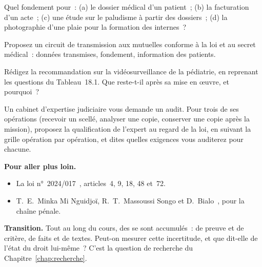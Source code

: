 \begin{boxexo}[title={\ding{45}\quad Exercice~18.1. Quel fondement \niveaubase}]
Quel fondement pour~: (a) le dossier médical d'un patient~; (b) la
facturation d'un acte~; (c) une étude sur le paludisme à partir des
dossiers~; (d) la photographie d'une plaie pour la formation des
internes~?
\end{boxexo}

\begin{boxexo}[title={\ding{45}\quad Exercice~18.2. Les mutuelles \niveaumoyen}]
Proposez un circuit de transmission aux mutuelles conforme à la loi et au
secret médical~: données transmises, fondement, information des patients.
\end{boxexo}

\begin{boxexo}[title={\ding{45}\quad Exercice~18.3. La caméra \niveaumoyen}]
Rédigez la recommandation sur la vidéosurveillance de la pédiatrie, en
reprenant les questions du Tableau~18.1. Que reste-t-il \NEK{} après sa mise
en œuvre, et pourquoi~?
\end{boxexo}

\begin{boxexo}[title={\ding{45}\quad Exercice~18.4. Un cabinet d'expertise \niveauexpert}]
Un cabinet d'expertise judiciaire vous demande un audit. Pour trois de ses
opérations (recevoir un scellé, analyser une copie, conserver une copie
après la mission), proposez la qualification de l'expert au regard de la
loi, en suivant la grille opération par opération, et dites quelles
exigences vous audit\-erez pour chacune.
\end{boxexo}

\bigskip

\begin{boxinfo}
\textbf{Pour aller plus loin.}
\begin{itemize}
    \item La loi n°~2024/017~\cite{loi2024017}, articles~4, 9, 18, 48 et~72.
    \item T.~E.~Minka Mi Nguidjoï, R.~T.~Massoussi Songo et
          D.~Bialo~\cite{minka2026chainepenale}, pour la chaîne pénale.
\end{itemize}
\end{boxinfo}

\begin{boxinfo}
\textbf{Transition.} Tout au long du cours, des \NEK{} se sont accumulés~: de
preuve et de critère, de faits et de textes. Peut-on mesurer cette
incertitude, et que dit-elle de l'état du droit lui-même~? C'est la
question de recherche du Chapitre~\ref{chap:recherche}.
\end{boxinfo}

